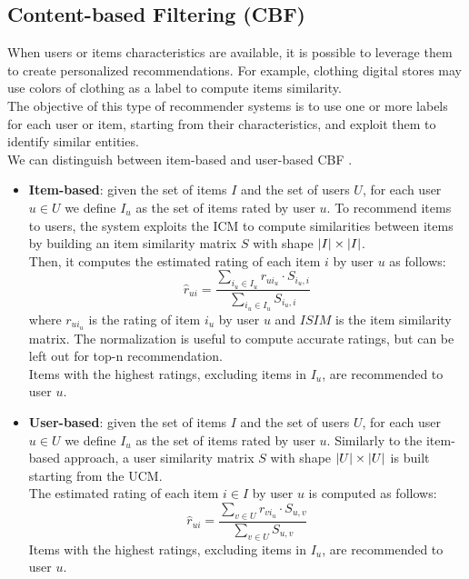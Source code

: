 \subsection{Content-based Filtering (CBF)}

When users or items characteristics are available, it is possible to leverage them to create personalized recommendations. For example, clothing digital stores may use colors of clothing as a label to compute items similarity.\\
The objective of this type of recommender systems is to use one or more labels for each user or item, starting from their characteristics, and exploit them to identify similar entities.\\
We can distinguish between item-based and user-based CBF \cite{10.1007/978-0-387-85820-3_1, 10.1007/978-3-540-72079-9_10}.
\begin{itemize}
\item \textbf{Item-based}: given the set of items $I$ and the set of users $U$, for each user $u \in U$ we define $I_u$ as the set of items rated by user $u$. To recommend items to users, the system exploits the ICM to compute similarities between items by building an item similarity matrix $S$ with shape $\left\lvert I\right\rvert \times \left\lvert I\right\rvert$.\\
Then, it computes the estimated rating of each item $i$ by user $u$ as follows:
\begin{equation*}
\hat{r}_{ui} = \frac{\sum_{i_u \in I_u} r_{ui_u} \cdot S_{i_u,i}}{\sum_{i_u \in I_u} S_{i_u,i}}
\end{equation*}
where $r_{ui_u}$ is the rating of item $i_u$ by user $u$ and $ISIM$ is the item similarity matrix. The normalization is useful to compute accurate ratings, but can be left out for top-n recommendation.\\
Items with the highest ratings, excluding items in $I_u$, are recommended to user $u$.
\item \textbf{User-based}: given the set of items $I$ and the set of users $U$, for each user $u \in U$ we define $I_u$ as the set of items rated by user $u$. Similarly to the item-based approach, a user similarity matrix $S$ with shape $\left\lvert U\right\rvert \times \left\lvert U\right\rvert$ is built starting from the UCM.\\
The estimated rating of each item $i \in I$ by user $u$ is computed as follows:
\begin{equation*}
\hat{r}_{ui} = \frac{\sum_{v \in U} r_{vi_u} \cdot S_{u,v}}{\sum_{v \in U} S_{u,v}}
\end{equation*}
Items with the highest ratings, excluding items in $I_u$, are recommended to user $u$.
\end{itemize}\par
